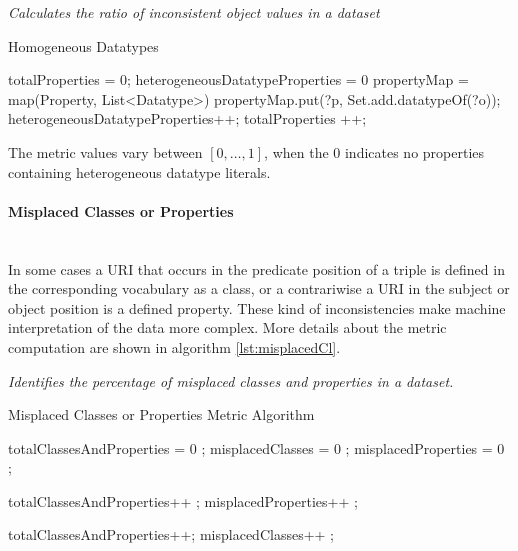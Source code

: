 \begin{mdframed}[style=metricdefinition]
\emph{Calculates the ratio of inconsistent object values in a dataset}
\end{mdframed}

\begin{algorithm}
\caption{Homogeneous Datatypes}\label{lst:heterogeneous}
\begin{algorithmic}[1]
\State totalProperties = 0;
\State heterogeneousDatatypeProperties = 0
\State  propertyMap = map(Property, List<Datatype>)
\EndProcedure
{}
  propertyMap.put(?p, Set.add.datatypeOf(?o)); \EndIf
\EndProcedure
{}
 heterogeneousDatatypeProperties++; 
\EndIf
totalProperties ++;
\EndFor
\EndProcedure
\end{algorithmic}
\end{algorithm}

The metric values vary between $[0,\ldots,1]$, when the 0 indicates no properties containing heterogeneous datatype literals.
  
\paragraph{Misplaced Classes or Properties}~\\
In some cases a URI that occurs in the predicate position of a triple is defined in the corresponding vocabulary as a class, or a contrariwise a URI in the subject or object position is a defined property.
These kind of inconsistencies make machine interpretation of the data more complex.
More details about the metric computation are shown in algorithm \ref{lst:misplacedCl}.

\begin{mdframed}[style=metricdefinition]
\emph{Identifies the percentage of misplaced classes and properties in a dataset.}
\end{mdframed}

\begin{algorithm}
\caption{Misplaced Classes or Properties Metric Algorithm}\label{lst:misplacedCl}
\begin{algorithmic}[1]
\State totalClassesAndProperties = 0 ;
\State misplacedClasses = 0 ;
\State misplacedProperties = 0 ;
\EndProcedure

 totalClassesAndProperties++ ;\EndIf 
{} misplacedProperties++ ; \EndIf 

 totalClassesAndProperties++; \EndIf  
{} misplacedClasses++ ; \EndIf 
\EndProcedure
\end{algorithmic}
\end{algorithm}

